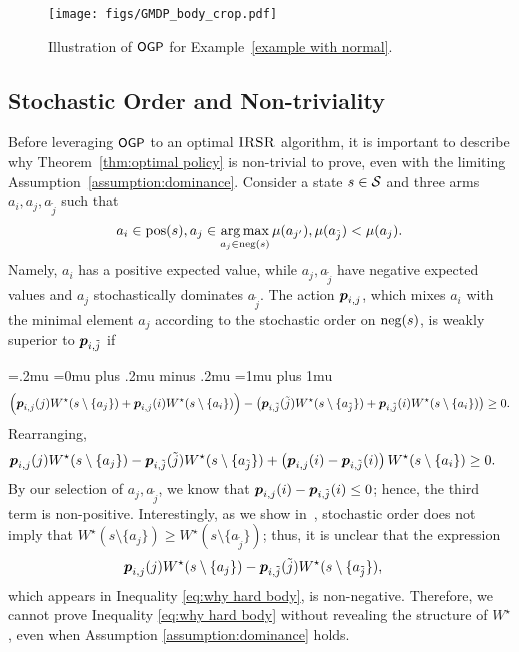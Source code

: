 \begin{figure}[t]
\centering
    \texttt{[image: figs/GMDP\_body\_crop.pdf]}
    \caption{Illustration of ${\small\textnormal{\textsf{OGP}}}$ for Example~\ref{example with normal}.\label{fig:tree small}}
\end{figure}
\subsection{Stochastic Order and Non-triviality}\label{subsec:stopchastic}
Before leveraging ${\small\textnormal{\textsf{OGP}}}$ to an optimal $\textsc{IRSR}$ algorithm, it is important to describe why Theorem~\ref{thm:optimal policy} is non-trivial to prove, even with the limiting Assumption~\ref{assumption:dominance}. Consider a state $s\in\mathcal{S}$ and three arms $a_i,a_j ,a_{\tilde j}$ such that
\[
a_i\in \textnormal{pos}(s), a_j \in \operatorname*{arg\,max}_{a_j \in \textnormal{neg}(s)} \mu(a_{j'}), \mu(a_{\tilde j})< \mu(a_j).
\]
Namely, $a_i$ has a positive expected value, while $a_j, a_{\tilde j}$ have negative expected values and $a_j$ stochastically dominates $a_{\tilde j}$. The action $\boldsymbol{ p }_{i,j}$, which mixes $a_i$ with the minimal element $a_j$ according to the stochastic order on $\textnormal{neg}(s)$, is weakly superior to  $\boldsymbol{ p }_{i,{\tilde{j}}}$ if 

{
\thinmuskip=.2mu
\medmuskip=0mu plus .2mu minus .2mu
\thickmuskip=1mu plus 1mu
\[
\Big(\boldsymbol{ p }_{i,j}(j)W^{\star}(s\setminus \{a_j\})+\boldsymbol{ p }_{i,j}(i)W^{\star}(s\setminus\{a_i\})\Big)-\left(\boldsymbol{ p }_{i,{\tilde j}}({\tilde j})W^{\star}(s\setminus \{a_{\tilde j}\})+\boldsymbol{ p }_{i,{\tilde j}}(i)W^{\star}(s\setminus\{a_i\})\right) \geq 0.
\]}%
Rearranging,
\begin{align}\label{eq:why hard body}
&\boldsymbol{ p }_{i,j}(j)W^{\star}(s\setminus \{a_j\})-\boldsymbol{ p }_{i,{\tilde j}}({\tilde j})W^{\star}(s\setminus \{a_{\tilde j}\})+\left(\boldsymbol{ p }_{i,j}(i)-\boldsymbol{ p }_{i,{\tilde j}}(i)\right)W^{\star}(s\setminus\{a_i\}) \geq 0.
\end{align}%
By our selection of $a_j,a_{\tilde j}$, we know that $\boldsymbol{ p }_{i,j}(i)-\boldsymbol{ p }_{i,{\tilde j}}(i) \leq 0$; hence, the third term is non-positive. Interestingly, as we show in~{\ifnum{}\fi}, stochastic order does not imply that $W^{\star}(s\setminus \{a_j\}) \geq W^{\star}(s\setminus \{a_{\tilde j}\})$; thus, it is unclear that the expression
{
\begin{align*}
&\boldsymbol{ p }_{i,j}(j)W^{\star}(s\setminus \{a_j\})-\boldsymbol{ p }_{i,{\tilde j}}({\tilde j})W^{\star}(s\setminus \{a_{\tilde j}\}),
\end{align*}}%
which appears in Inequality \eqref{eq:why hard body}, is non-negative. Therefore, we cannot prove Inequality  \eqref{eq:why hard body} without revealing the structure of $W^{\star}$, even when Assumption \ref{assumption:dominance} holds. 























